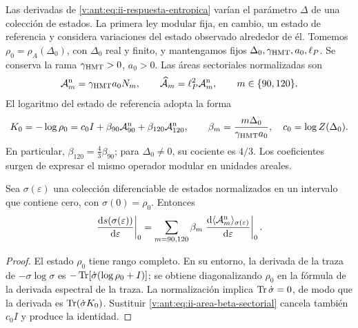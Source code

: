 Las derivadas de \eqref{v:ant:eq:ii-respuesta-entropica} varían el parámetro
\(\Delta\) de una colección de estados. La primera ley modular fija,
en cambio, un estado de referencia y considera variaciones del estado
observado alrededor de él. Tomemos
\(\rho_0=\rho_A(\Delta_0)\), con \(\Delta_0\) real y finito,
y mantengamos fijos \(\Delta_0,\gamma_{\mathrm{HMT}},a_0,\ell_P\).
Se conserva la rama \(\gamma_{\mathrm{HMT}}>0\), \(a_0>0\).
Las áreas sectoriales normalizadas son
\begin{equation}
 \mathcal A_m^{\rm n}=\gamma_{\mathrm{HMT}}a_0N_m,
 \qquad
 \widehat{\mathcal A}_m=\ell_P^2\mathcal A_m^{\rm n},
 \qquad m\in\{90,120\}.
 \label{v:ant:eq:ii-area-sector-normalizado}
\end{equation}
El logaritmo del estado de referencia adopta la forma
\begin{equation}
 K_0=-\log\rho_0
 =c_0I+\beta_{90}\mathcal A_{90}^{\rm n}
         +\beta_{120}\mathcal A_{120}^{\rm n},
 \qquad
 \beta_m=\frac{m\Delta_0}{\gamma_{\mathrm{HMT}}a_0},
 \quad c_0=\log Z(\Delta_0).
 \label{v:ant:eq:ii-area-beta-sectorial}
\end{equation}
En particular, \(\beta_{120}=\tfrac43\beta_{90}\); para
\(\Delta_0\ne0\), su cociente es \(4/3\). Los coeficientes
surgen de expresar el mismo operador modular en unidades areales.

\begin{theorem}
\label{v:ant:thm:ii-area-primera-ley}
Sea \(\sigma(\varepsilon)\) una colección diferenciable de estados
normalizados en un intervalo que contiene cero, con
\(\sigma(0)=\rho_0\). Entonces
\begin{equation}
 \left.\frac{\mathrm d s(\sigma(\varepsilon))}{\mathrm d\varepsilon}\right|_0
 =\sum_{m=90,120}\beta_m
   \left.\frac{\mathrm d\langle\mathcal A_m^{\rm n}\rangle_
                       {\sigma(\varepsilon)}}{\mathrm d\varepsilon}\right|_0.
 \label{v:ant:eq:ii-area-primera-ley}
\end{equation}
\end{theorem}
\begin{proof}
El estado \(\rho_0\) tiene rango completo. En su entorno, la derivada
de la traza de \(-\sigma\log\sigma\) es
\(-\operatorname{Tr}[\dot\sigma(\log\rho_0+I)]\); se obtiene diagonalizando
\(\rho_0\) en la fórmula de la derivada espectral de la traza.
La normalización implica \(\operatorname{Tr}\dot\sigma=0\), de modo que la
derivada es \(\operatorname{Tr}(\dot\sigma K_0)\). Sustituir
\eqref{v:ant:eq:ii-area-beta-sectorial} cancela también \(c_0I\) y
produce la identidad.
\end{proof}

